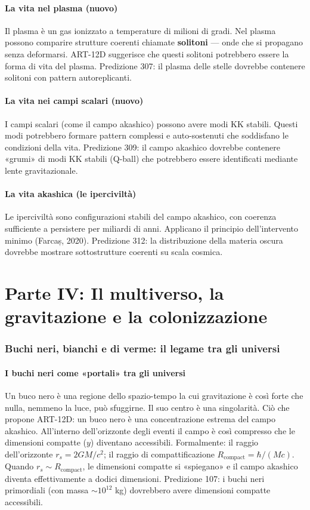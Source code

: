 \documentclass[11pt,a4paper]{article}
\begin{document}
\subsection{La vita nel plasma (nuovo)}
Il plasma è un gas ionizzato a temperature di milioni di gradi. Nel plasma possono comparire strutture coerenti chiamate \textbf{solitoni} --- onde che si propagano senza deformarsi. ART-12D suggerisce che questi solitoni potrebbero essere la forma di vita del plasma. Predizione 307: il plasma delle stelle dovrebbe contenere solitoni con pattern autoreplicanti.

\subsection{La vita nei campi scalari (nuovo)}
I campi scalari (come il campo akashico) possono avere modi KK stabili. Questi modi potrebbero formare pattern complessi e auto-sostenuti che soddisfano le condizioni della vita. Predizione 309: il campo akashico dovrebbe contenere «grumi» di modi KK stabili (Q-ball) che potrebbero essere identificati mediante lente gravitazionale.

\subsection{La vita akashica (le iperciviltà)}
Le iperciviltà sono configurazioni stabili del campo akashico, con coerenza sufficiente a persistere per miliardi di anni. Applicano il principio dell'intervento minimo (Farcaș, 2020). Predizione 312: la distribuzione della materia oscura dovrebbe mostrare sottostrutture coerenti su scala cosmica.

\newpage
\part*{Parte IV: Il multiverso, la gravitazione e la colonizzazione}

\section{Buchi neri, bianchi e di verme: il legame tra gli universi}
\subsection{I buchi neri come «portali» tra gli universi}
Un buco nero è una regione dello spazio-tempo la cui gravitazione è così forte che nulla, nemmeno la luce, può sfuggirne. Il suo centro è una singolarità. Ciò che propone ART-12D: un buco nero è una concentrazione estrema del campo akashico. All'interno dell'orizzonte degli eventi il campo è così compresso che le dimensioni compatte ($y$) diventano accessibili. Formalmente: il raggio dell'orizzonte $r_s = 2GM/c^2$; il raggio di compattificazione $R_{\text{compact}} = \hbar/(Mc)$. Quando $r_s \sim R_{\text{compact}}$, le dimensioni compatte si «spiegano» e il campo akashico diventa effettivamente a dodici dimensioni. Predizione 107: i buchi neri primordiali (con massa $\sim 10^{12}$ kg) dovrebbero avere dimensioni compatte accessibili.
\end{document}

